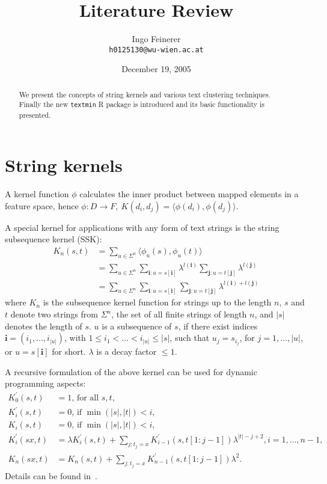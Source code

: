 \documentclass[a4paper]{article}
\author{Ingo Feinerer\\\texttt{h0125130@wu-wien.ac.at}}
\title{Literature Review}
\date{December 19, 2005}
\begin{document}
\maketitle

\begin{abstract}
We present the concepts of string kernels and various text clustering
techniques. Finally the new \texttt{textmin} \textsf{R} package is
introduced and its basic functionality is presented.
\end{abstract}
\section{String kernels}
A kernel function $\phi$ calculates the inner product between mapped elements
in a feature space, hence $\phi: D \rightarrow F,~K(d_i,d_j) = \langle
\phi(d_i),\phi(d_j) \rangle$.

A special kernel for applications with any form of text strings is the
string subsequence kernel (SSK):
\begin{align*}
  K_n(s,t) &= \sum_{u \in \Sigma^n} \langle \phi_u(s),\phi_u(t)
  \rangle\\
  &= \sum_{u \in \Sigma^n} \sum_{\mathbf{i}:u=s[\mathbf{i}]}
  \lambda^{l(\mathbf{i})} \sum_{\mathbf{j}:u=t[\mathbf{j}]}
  \lambda^{l(\mathbf{j})}\\
  &= \sum_{u \in \Sigma^n} \sum_{\mathbf{i}:u=s[\mathbf{i}]}
  \sum_{\mathbf{j}:u=t[\mathbf{j}]} \lambda^{l(\mathbf{i}) +
    l(\mathbf{j})}
\end{align*}
where $K_n$ is the subsequence kernel function for strings up to the
length $n$, $s$ and $t$ denote two strings from $\Sigma^n$, the
set of all finite strings of length $n$, and $|s|$ denotes the length
of $s$. $u$ is a subsequence of $s$, if there exist indices
$\mathbf{i} = (i_1,\ldots,i_{|u|})$, with $1 \leq i_1 < \ldots < i_{|u|}
\leq |s|$, such that $u_j = s_{i_j}$, for $j = 1,\ldots,|u|$, or
$u=s[\mathbf{i}]$ for short. $\lambda$ is a decay factor $\leq 1$.

A recursive formulation of the above kernel can be used for dynamic
programming aspects:
\begin{align*}
  K_0^{\prime}(s,t) &= 1 \text{, for all } s, t,\\
  K_i^{\prime}(s,t) &= 0 \text{, if } \min (|s|,|t|) < i,\\
  K_i(s,t) &= 0 \text{, if } \min (|s|,|t|) < i,\\
  K_i^{\prime}(sx,t) &= \lambda K_i^{\prime}(s,t) + \sum_{j:t_j=x}
  K_{i-1}^{\prime}(s,t[1:j-1])\lambda^{|t|-j+2}, i = 1,\ldots,n-1,\\
  K_n(sx,t) &= K_n(s,t) + \sum_{j:t_j=x}
  K_{n-1}^{\prime}(s,t[1:j-1])\lambda^2.
\end{align*}
Details can be found in~\cite{lodhi02}.
\end{document}
